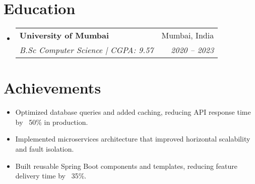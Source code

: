 \documentclass[letterpaper,11pt]{article}
\makeatletter
\newcommand{\resumeSubheading}[4]{
  \vspace{-2pt}\item
    \begin{tabular*}{0.98\textwidth}[t]{l@{\extracolsep{\fill}}r}
      \textbf{#1} & #2 \\
      \textit{\small#3} & \textit{\small #4} \\
    \end{tabular*}\vspace{-7pt}
}
\makeatother
\begin{document}
\section{Education}
  \begin{itemize}[leftmargin=0.15in]
    \resumeSubheading
      {University of Mumbai}{Mumbai, India}
      {B.Sc Computer Science | CGPA: 9.57}{2020 -- 2023}
  \end{itemize}

\section{Achievements}
\begin{itemize}
    \item Optimized database queries and added caching, reducing API response time by ~50\% in production.
    \item Implemented microservices architecture that improved horizontal scalability and fault isolation.
    \item Built reusable Spring Boot components and templates, reducing feature delivery time by ~35\%.
\end{itemize}
\end{document}
